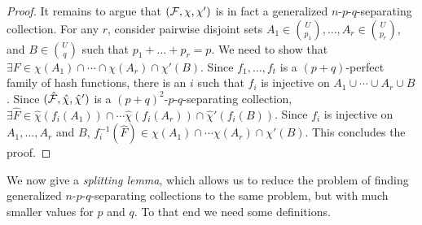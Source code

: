 \begin{proof}
It remains to argue that $({\cal F},\chi,\chi')$ is in fact a generalized $n$-$p$-$q$-separating collection. For any $r$, consider pairwise disjoint sets $A_1 \in {U \choose p_1},\ldots,A_r \in {U \choose p_r}$, and 
$B \in {U \choose q}$ such that $p_1+\ldots+p_r=p$. We need to show that $\exists F\in \chi(A_1)\cap\cdots\cap\chi(A_r)\cap\chi'(B)$. 
Since $f_1, \ldots, f_t$ is a $(p+q)$-perfect family of hash functions, there is an $i$ such that $f_i$ is injective on $A_1\cup\cdots \cup A_r \cup B$. 
Since $(\hat{\cal F}, \hat{\chi},\hat{\chi}')$ is a $(p+q)^2$-$p$-$q$-separating collection,  
$\exists \hat{F}\in \hat{\chi}(f_i(A_1))\cap\cdots\hat{\chi}(f_i(A_r))\cap \hat{\chi}'(f_i(B))$. Since $f_i$ is injective on $A_1,\ldots,A_r$ and $B$, $f_i^{-1}(\hat{F})\in \chi(A_1)\cap\cdots \chi(A_r) \cap\chi'(B)$. 
This concludes the proof.
\end{proof}
We now give a {\em splitting lemma}, which allows us to reduce the problem of finding generalized $n$-$p$-$q$-separating collections to the same problem, but with much smaller values for $p$ and $q$. To that end we need some definitions.


